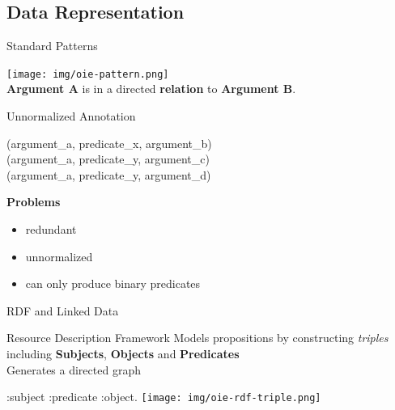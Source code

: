 \documentclass[11pt]{beamer}
\begin{document}
	\subsection{Data Representation}
		\begin{frame}{Standard Patterns}
			\begin{center}
				\texttt{[image: img/oie-pattern.png]}\\
				\vspace{15pt}
				\textbf{Argument A} is in a directed \textbf{relation} to \textbf{Argument B}.
			\end{center}
		\end{frame}
		
		\begin{frame}{Unnormalized Annotation}
			\begin{center}
				(argument\_a, predicate\_x, argument\_b)\\
				(argument\_a, predicate\_y, argument\_c)\\
				(argument\_a, predicate\_y, argument\_d)
			\end{center}
			\vspace{15pt}
			\textbf{Problems}\\
			\begin{itemize}
				\item redundant
				\item unnormalized
				\item can only produce binary predicates
			\end{itemize}
		\end{frame}
		
		\begin{frame}{RDF and Linked Data}
			\begin{block}{Resource Description Framework}
				Models propositions by constructing \textit{triples} including \textbf{Subjects}, \textbf{Objects} and \textbf{Predicates}\\
				Generates a directed graph
			\end{block}
			\vspace{10pt}
			\begin{center}
				:subject :predicate :object.
				\vspace{10pt}
				\texttt{[image: img/oie-rdf-triple.png]}
			\end{center}
		\end{frame}
		
\end{document}
